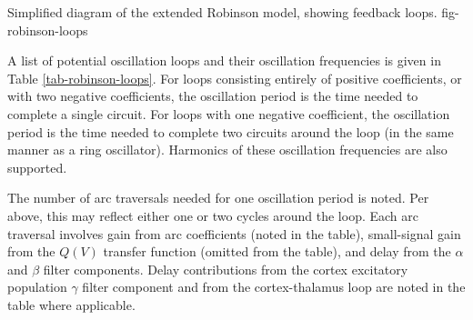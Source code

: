 {Simplified diagram of the extended Robinson model, showing feedback loops.}
{fig-robinson-loops}

A list of potential oscillation loops and their oscillation frequencies is
given in Table \ref{tab-robinson-loops}. For loops consisting entirely of
positive coefficients, or with two negative coefficients, the oscillation
period is the time needed to complete a single circuit. For loops with one
negative coefficient, the oscillation period is the time needed to complete
two circuits around the loop (in the same manner as a ring oscillator).
Harmonics of these oscillation frequencies are also supported.

The number of arc traversals needed for one oscillation period is noted.
Per above, this may reflect either one or two cycles around the loop. Each
arc traversal involves gain from arc coefficients (noted in the table),
small-signal gain from the $Q(V)$ transfer function (omitted from the table),
and delay from the $\alpha$ and $\beta$ filter components. Delay
contributions from the cortex excitatory population $\gamma$ filter
component and from the cortex-thalamus loop are noted in the table where
applicable.

